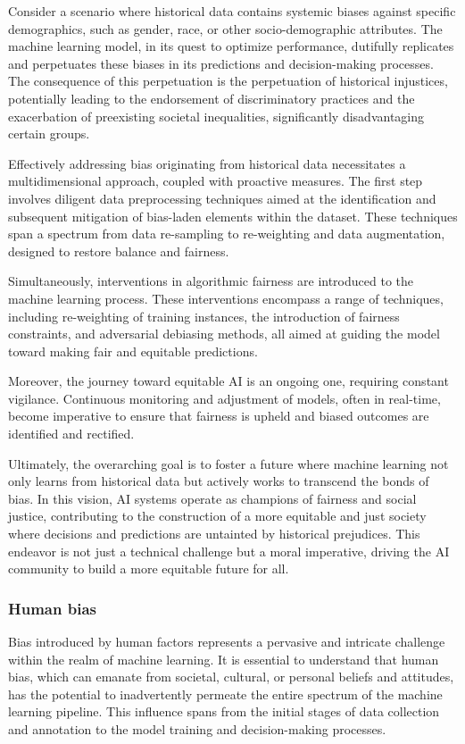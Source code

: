 \documentclass[12pt,a4paper,openright,twoside]{book}
\begin{document}
Consider a scenario where historical data contains systemic biases against specific demographics, such as gender, race, or other socio-demographic attributes. The machine learning model, in its quest to optimize performance, dutifully replicates and perpetuates these biases in its predictions and decision-making processes. The consequence of this perpetuation is the perpetuation of historical injustices, potentially leading to the endorsement of discriminatory practices and the exacerbation of preexisting societal inequalities, significantly disadvantaging certain groups. 

Effectively addressing bias originating from historical data necessitates a multidimensional approach, coupled with proactive measures. The first step involves diligent data preprocessing techniques aimed at the identification and subsequent mitigation of bias-laden elements within the dataset. These techniques span a spectrum from data re-sampling to re-weighting and data augmentation, designed to restore balance and fairness. 

Simultaneously, interventions in algorithmic fairness are introduced to the machine learning process. These interventions encompass a range of techniques, including re-weighting of training instances, the introduction of fairness constraints, and adversarial debiasing methods, all aimed at guiding the model toward making fair and equitable predictions. 

Moreover, the journey toward equitable AI is an ongoing one, requiring constant vigilance. Continuous monitoring and adjustment of models, often in real-time, become imperative to ensure that fairness is upheld and biased outcomes are identified and rectified. 

Ultimately, the overarching goal is to foster a future where machine learning not only learns from historical data but actively works to transcend the bonds of bias. In this vision, AI systems operate as champions of fairness and social justice, contributing to the construction of a more equitable and just society where decisions and predictions are untainted by historical prejudices. This endeavor is not just a technical challenge but a moral imperative, driving the AI community to build a more equitable future for all.

\subsubsection{Human bias}

Bias introduced by human factors represents a pervasive and intricate challenge within the realm of machine learning. It is essential to understand that human bias, which can emanate from societal, cultural, or personal beliefs and attitudes, has the potential to inadvertently permeate the entire spectrum of the machine learning pipeline. This influence spans from the initial stages of data collection and annotation to the model training and decision-making processes. 
\end{document}
